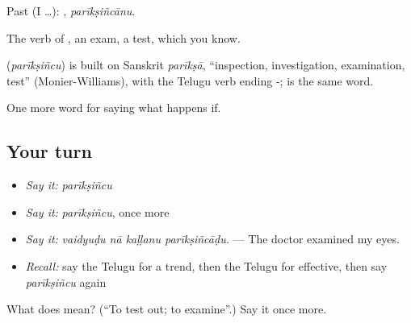 Past (I …): , \emph{parīkṣiñcānu}.

The verb of , an exam, a test, which you know.

\begin{cousinweb}
\textbf{} (\emph{parīkṣiñcu}) is built on Sanskrit \emph{parīkṣā}, \textquotedblleft{}inspection, investigation, examination, test\textquotedblright{} (Monier-Williams), with the Telugu verb ending -;  is the same word.
\end{cousinweb}

\begin{grammarlens}[title={What you've built}]
One more word for saying what happens if.
\end{grammarlens}

\subsection*{Your turn}
\begin{itemize}
\raggedright
  \item \emph{Say it:} \emph{parīkṣiñcu}
  \item \emph{Say it:} \emph{parīkṣiñcu}, once more
  \item \emph{Say it:} \emph{vaidyuḍu nā kaḷḷanu parīkṣiñcāḍu.} — The doctor examined my eyes.
  \item \emph{Recall:} say the Telugu for a trend, then the Telugu for effective, then say \emph{parīkṣiñcu} again
\end{itemize}

\begin{tcolorbox}[breakable,colback=teal!4,colframe=teal!35!black,title={Before you move on}]
What does  mean? (\textquotedblleft{}To test out; to examine\textquotedblright{}.) Say it once more.
\end{tcolorbox}
